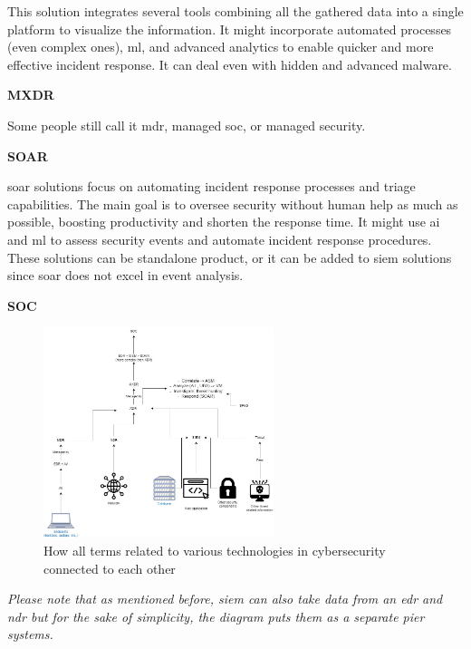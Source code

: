 \begin{multicols}{2}
      This solution integrates several tools combining all the gathered data into a single platform to visualize the information. It might incorporate
      automated processes (even complex ones), \acrshort{ml}, and advanced analytics to enable quicker and more effective incident response. It can
      deal even with hidden and advanced malware.

      \textbf{MXDR}

      Some people still call it \acrshort{mdr}, managed \acrshort{soc}, or managed security.

      \textbf{SOAR}

      \acrshort{soar} solutions focus on automating incident response processes and triage capabilities. The main goal is to oversee security without
      human help as much as possible, boosting productivity and shorten the response time. It might use \acrshort{ai} and \acrshort{ml} to assess
      security events and automate incident response procedures. These solutions can be standalone product, or it can be added to \acrshort{siem}
      solutions since \acrshort{soar} does not excel in event analysis.

      \textbf{SOC}

      \begin{figure}[htbp]
            \centering
            \includegraphics[width=0.6\textwidth]{Figures/XDR.jpg}
            \caption{How all terms related to various technologies in cybersecurity connected to each other}
            \label{fig:xdr}
      \end{figure}

      \textit{Please note that as mentioned before, \acrshort{siem} can also take data from an \acrshort{edr} and \acrshort{ndr} but for
            the sake of simplicity, the diagram puts them as a separate pier systems.}


\end{multicols}
